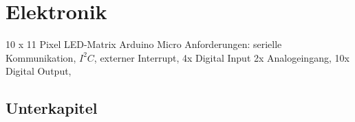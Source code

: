 
\section{Elektronik}
\label{sec:Elektronik}
10 x 11 Pixel  LED-Matrix
Arduino Micro 
Anforderungen: serielle Kommunikation, $I^{2}C$, externer Interrupt, 4x Digital Input 2x Analogeingang, 10x Digital Output, 
\subsection{Unterkapitel}

